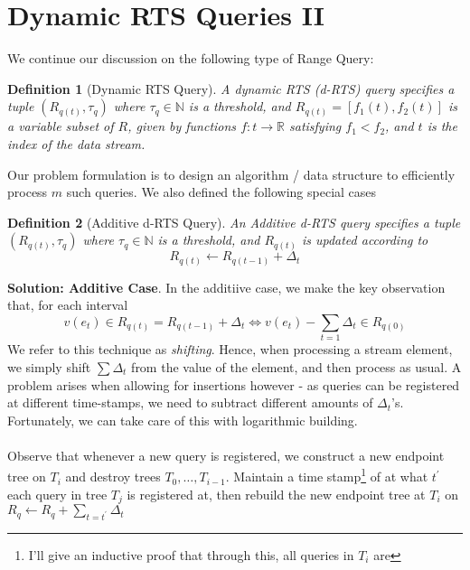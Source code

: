 \documentclass{article}
\newtheorem{definition}{Definition}
\begin{document}
\hspace{95mm}

\section*{Dynamic RTS Queries II}

We continue our discussion on the following type of Range Query: 

\begin{definition}[Dynamic RTS Query] A dynamic RTS (\textit{d-RTS}) query specifies a tuple $(R_{q(t)}, \tau_q)$ where $\tau_q \in \mathbb{N}$
    is a threshold, and $R_{q(t)} =[f_1(t), f_2(t)]$ is a variable subset of $R$, given by functions $f: t\rightarrow\mathbb{R}$ satisfying $f_1 < f_2$, and $t$ is the index of the data stream.
\end{definition}

Our problem formulation is to design an algorithm / data structure to efficiently process $m$ such queries. We also defined the following special cases

\begin{definition}[Additive d-RTS Query]
    An Additive d-RTS query specifies a tuple $(R_{q(t)}, \tau_q)$ where $\tau_q\in \mathbb{N}$ is a threshold, and $R_{q(t)}$ is updated according to
    $$R_{q(t)} \leftarrow R_{q(t-1)} + \Delta_t$$
\end{definition}
\textbf{Solution: Additive Case}. In the additiive case, we make the key observation that, for each interval
$$v(e_t)\in R_{q(t)}  = R_{q(t-1)}+\Delta_t\iff v(e_t)-\sum_{t=1}\Delta_t\in R_{q(0)}$$
We refer to this technique as \textit{shifting}. Hence, when processing a stream element, we simply shift $\sum \Delta_t$ from the value of the element, and then process as usual. A problem arises when allowing for insertions however - as queries can be registered at different time-stamps, we need to subtract different amounts of $\Delta_t$'s. Fortunately, we can take care of this with logarithmic building. \\
\\
Observe that whenever a new query is registered, we construct a new endpoint tree on $T_i$ and destroy trees $T_0, \dots, T_{i-1}$. Maintain a time stamp\footnote{I'll give an inductive proof that through this, all queries in $T_i$ are } of at what $t^\prime$ each query in tree $T_j$ is registered at, then rebuild the new endpoint tree at $T_i$ on $R_q \leftarrow R_q + \sum_{t = t^\prime}\Delta_t$
\end{document}
